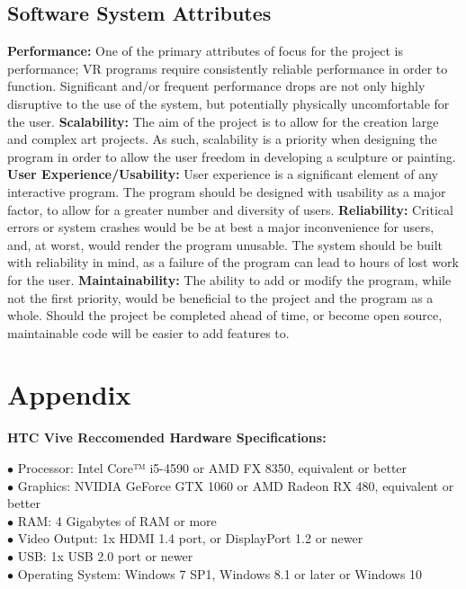 \documentclass[onecolumn, draftclsnofoot,10pt, compsoc]{IEEEtran}
\begin{document}
\subsection{Software System Attributes}
\textbf{Performance:}
\newline
One of the primary attributes of focus for the project is performance; VR programs require consistently reliable performance in order to function. Significant and/or frequent performance drops are not only highly disruptive to the use of the system, but potentially physically uncomfortable for the user.
\newline
\textbf{Scalability:}
\newline
The aim of the project is to allow for the creation large and complex art projects. As such, scalability is a priority when designing the program in order to allow the user freedom in developing a sculpture or painting.
\newline
\textbf{User Experience/Usability:}
\newline
User experience is a significant element of any interactive program. The program should be designed with usability as a major factor, to allow for a greater number and diversity of users.
\newline
\textbf{Reliability:}
\newline
Critical errors or system crashes would be be at best a major inconvenience for users, and, at worst, would render the program unusable. The system should be built with reliability in mind, as a failure of the program can lead to hours of lost work for the user.
\newline
\textbf{Maintainability:}
\newline
The ability to add or modify the program, while not the first priority, would be beneficial to the project and the program as a whole. Should the project be completed ahead of time, or become open source, maintainable code will be easier to add features to.
\section{Appendix}
\textbf{HTC Vive Reccomended Hardware Specifications:}
\begin{description}
 \item[$\bullet$  Processor: Intel Core™ i5-4590 or AMD FX 8350, equivalent or better]
 \item[$\bullet$  Graphics: NVIDIA GeForce GTX 1060 or AMD Radeon RX 480, equivalent or better]
 \item[$\bullet$  RAM: 4 Gigabytes of RAM or more]
\item[$\bullet$  Video Output: 1x HDMI 1.4 port, or DisplayPort 1.2 or newer]
\item[$\bullet$  USB: 1x USB 2.0 port or newer]
\item[$\bullet$  Operating System: Windows 7 SP1, Windows 8.1 or later or Windows 10]
\end{description}
\cite{vive}
\end{document}
